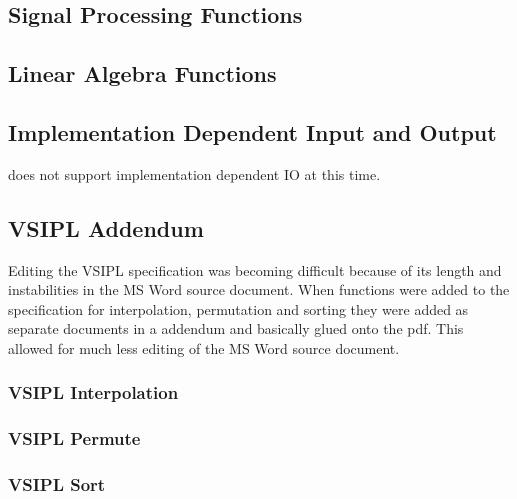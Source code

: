\subsection*{Signal Processing Functions}
    
    
    
    
    
    
\subsection*{Linear Algebra Functions}
    
    
    
\subsection*{Implementation Dependent Input and Output}
    does not support implementation dependent IO at this time.
\subsection*{VSIPL Addendum}
Editing the VSIPL specification was becoming difficult because of its length and instabilities in the MS Word source document. When functions were added to the specification for interpolation, permutation and sorting they were added as separate documents in a addendum and basically glued onto the pdf. This allowed for much less editing of the MS Word source document.
\subsubsection*{VSIPL Interpolation}
\subsubsection*{VSIPL Permute}
\subsubsection*{VSIPL Sort}
%
